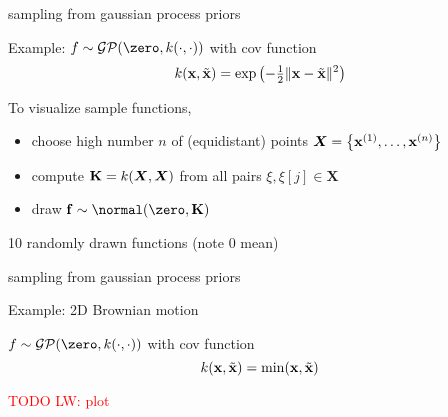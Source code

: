 \documentclass[11pt,compress,t,notes=noshow, xcolor=table]{beamer}
\begin{document}
\begin{framei}[sep=L]{sampling from gaussian process priors}
\item Example: $f \sim \mathcal{GP}(\zero, k(\cdot, \cdot))$ with cov function
$$ k(\mathbf{x}, \tilde{\mathbf{x}}) = \exp\left(-\tfrac{1}{2}\|\mathbf{x} - \tilde{\mathbf{x}}\|^2\right)$$
\item To visualize sample functions, 
\begin{itemize}
\item choose high number $n$ of (equidistant) points $\bm{X} = \left\{ \mathbf{x}^{(1)}, \ldots, \mathbf{x}^{(n)}\right\}$
  \item compute $\mathbf{K} = k(\bm{X}, \bm{X})$ from all pairs $\xi, \xi[j] \in \bm{X}$ 
  \item draw $\fv \sim \normal(\zero, \Kmat)$ 
\end{itemize}
\item 10 randomly drawn functions (note 0 mean)
\vfill
{}
\end{framei}

\begin{framei}[sep=L]{sampling from gaussian process priors}
\item Example: 2D Brownian motion
\item $f \sim \mathcal{GP}(\zero, k(\cdot, \cdot))$ with cov function
$$ k(\mathbf{x}, \tilde{\mathbf{x}}) = \min (\mathbf{x}, \tilde{\mathbf{x}})$$
\item \textcolor{red}{TODO LW: plot}
\end{framei}

\endlecture
\end{document}

